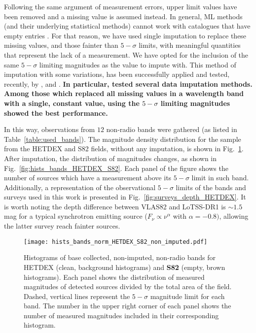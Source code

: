 \documentclass{aa}
\begin{document}
Following the same argument of measurement errors, upper limit values have been removed and a missing value is assumed instead. In general, ML methods (and their underlying statistical methods) cannot work with catalogues that have empty entries \citep{allison2001missing}. For that reason, we have used single imputation \citep[a review on the use of this method\textbf{, which is part of data cleansing,} in astronomy can be seen in][]{ChattopadhyayData} to replace these missing values, and those fainter than $5{-}\sigma$ limits, with meaningful quantities that represent the lack of a measurement. 
We have opted for the inclusion of the same $5{-}\sigma$ limiting magnitudes as the value to impute with. 
This method of imputation with some variations, has been successfully applied and tested, recently, by \citet{2020MNRAS.498.1750A, 2021Galax...9...86C, 2022MNRAS.512.2099C}, and \citet{2022MNRAS.514....1C}. \textbf{In particular, \citet{2022MNRAS.512.2099C} tested several data imputation methods. Among those which replaced all missing values in a wavelength band with a single, constant value, using the $5{-}\sigma$ limiting magnitudes showed the best performance.}

In this way, observations from $12$ non-radio bands were gathered (as listed in Table~\ref{table:used_bands}). 
The magnitude density distribution for the sample from the HETDEX and S82 fields, without any imputation, is shown in Fig.~\ref{fig:hists_bands_nonimp_HETDEX_S82}. After imputation, the distribution of magnitudes changes, as shown in Fig.~\ref{fig:hists_bands_HETDEX_S82}. Each panel of the figure shows the number of sources which have a measurement above its $5{-}\sigma$ limit in such band. 
Additionally, a representation of the observational $5{-}\sigma$ limits of the bands and surveys used in this work is presented in Fig.~\ref{fig:surveys_depth_HETDEX}. 
It is worth noting the depth difference between VLAS82 and LoTSS-DR1 is ${\sim}1.5$\,mag for a typical synchrotron emitting source ($F_\nu \propto \nu^{\alpha}$ with $\alpha {=}-0.8)$, allowing the latter survey reach fainter sources.%

\begin{figure}
  \centering
  \texttt{[image: hists\_bands\_norm\_HETDEX\_S82\_non\_imputed.pdf]}
  \caption{Histograms of base collected, non-imputed, non-radio bands for HETDEX (clean, background histograms) and \textbf{S82} (empty, brown histograms). Each panel shows the distribution of measured magnitudes of detected sources divided by the total area of the field. Dashed, vertical lines represent the $5{-}\sigma$ magnitude limit for each band. The number in the upper right corner of each panel shows the number of measured magnitudes included in their corresponding histogram.}
  \label{fig:hists_bands_nonimp_HETDEX_S82}
\end{figure}
\end{document}
